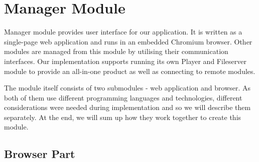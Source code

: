 \section{Manager Module}

Manager module provides user interface for our application. It is written as a single-page web application and runs in an embedded Chromium browser. Other modules are managed from this module by utilising their communication interfaces. Our implementation supports running its own Player and Fileserver module to provide an all-in-one product as well as connecting to remote modules.
\par
The module itself consists of two submodules - web application and browser. As both of them use different programming languages and technologies, different considerations were needed during implementation and so we will describe them separately. At the end, we will sum up how they work together to create this module.

\subsection{Browser Part}

